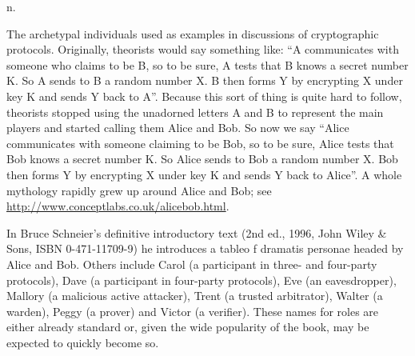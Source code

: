  n.

The archetypal individuals used as examples in discussions of cryptographic protocols. Originally, theorists would say something like: ``A
communicates with someone who claims to be B, so to be sure, A tests that B knows a secret number K. So A sends to B a random number X. B
then forms Y by encrypting X under key K and sends Y back to A''. Because this sort of thing is quite hard to follow, theorists stopped
using the unadorned letters A and B to represent the main players and started calling them Alice and Bob. So now we say ``Alice communicates
with someone claiming to be Bob, so to be sure, Alice tests that Bob knows a secret number K. So Alice sends to Bob a random number X. Bob
then forms Y by encrypting X under key K and sends Y back to Alice''. A whole mythology rapidly grew up around Alice and Bob; see
\url{http://www.conceptlabs.co.uk/alicebob.html}.

In Bruce Schneier's definitive introductory text  (2nd ed., 1996, John Wiley \& Sons, ISBN 0-471-11709-9) he
introduces a tableo f dramatis personae headed by Alice and Bob. Others include Carol (a participant in three- and four-party protocols),
Dave (a participant in four-party protocols), Eve (an eavesdropper), Mallory (a malicious active attacker), Trent (a trusted arbitrator),
Walter (a warden), Peggy (a prover) and Victor (a verifier). These names for roles are either already standard or, given the wide popularity
of the book, may be expected to quickly become so.

